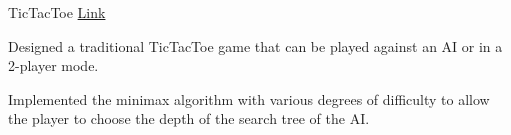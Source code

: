 \begin{cventries}

  \cventry
    {TicTacToe} %
    {} %
    {}
    {\textcolor{link}{\href{https://aadela-tictactoe-web.netlify.app/}{Link}}}%
    {
      \begin{cvitems} %
        \item {Designed a traditional TicTacToe game that can be played against an AI or in a 2-player mode.}
        \item {Implemented the minimax algorithm with various degrees of difficulty to allow the player to choose the depth of the search tree of the AI.}
      \end{cvitems}
    }
    
\end{cventries}
